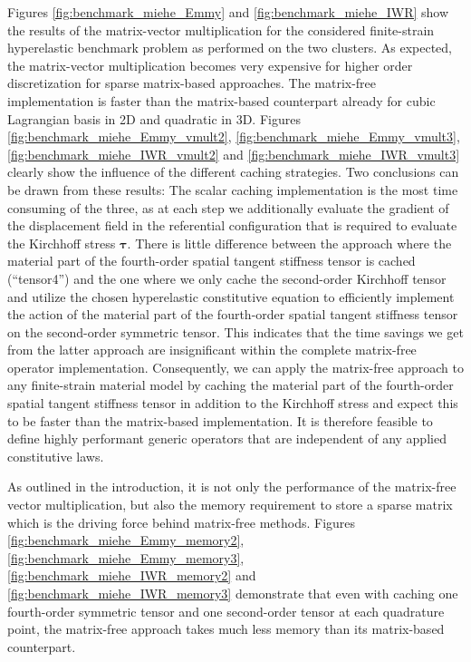 \documentclass[times,doublespace]{nmeauth}
\def\gz  #1{           \mbox{$\boldsymbol{#1}$}}
\begin{document}
Figures \ref{fig:benchmark_miehe_Emmy} and \ref{fig:benchmark_miehe_IWR} show the results of the matrix-vector multiplication {\color{red}for the considered finite-strain hyperelastic benchmark problem} as performed on the two clusters.
As expected, the matrix-vector multiplication becomes very expensive for higher order discretization for sparse matrix-based approaches.
The matrix-free implementation is faster than the matrix-based counterpart already for cubic Lagrangian basis in 2D and quadratic in 3D.
Figures \ref{fig:benchmark_miehe_Emmy_vmult2}, \ref{fig:benchmark_miehe_Emmy_vmult3}, \ref{fig:benchmark_miehe_IWR_vmult2} and \ref{fig:benchmark_miehe_IWR_vmult3} clearly show the influence of the different caching strategies.
Two conclusions can be drawn from these results:
The scalar caching implementation is the most time consuming of the three, as at each step we additionally evaluate the gradient of the displacement field in the {\color{red}referential} configuration that is required to evaluate the Kirchhoff stress $\gz \tau$.
There is little difference between the approach where the {\color{red}material part of the fourth-order spatial tangent stiffness tensor} is cached (``tensor4'') and the one where we only cache the second-order Kirchhoff tensor and utilize the chosen hyperelastic constitutive equation to efficiently implement the action of the {\color{red}material part of the fourth-order spatial tangent stiffness tensor} on the second-order symmetric tensor.
This indicates that the time savings we get from the latter approach are insignificant within the complete matrix-free operator implementation.
Consequently, we can apply the matrix-free approach to any finite-strain material model by caching the {\color{red}material part of the fourth-order spatial tangent stiffness tensor} in addition to the Kirchhoff stress and expect this to be faster than the matrix-based implementation.
It is therefore feasible to define highly performant generic operators that are independent of any applied constitutive laws.

As outlined in the introduction, it is not only the performance of the matrix-free vector multiplication, but also the memory requirement to store a sparse matrix which is the driving force behind matrix-free methods.
Figures \ref{fig:benchmark_miehe_Emmy_memory2}, \ref{fig:benchmark_miehe_Emmy_memory3}, \ref{fig:benchmark_miehe_IWR_memory2} and \ref{fig:benchmark_miehe_IWR_memory3} demonstrate that even with caching one fourth-order symmetric tensor and one second-order tensor at each quadrature point, the matrix-free approach takes much less memory than its matrix-based counterpart.
\end{document}
